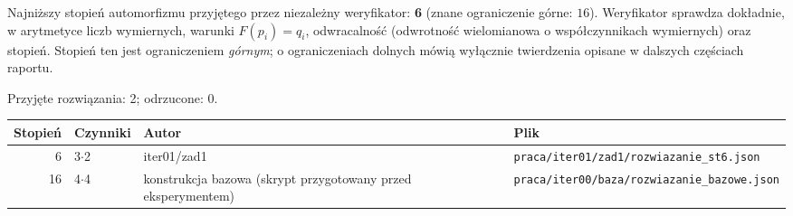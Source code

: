 Najniższy stopień automorfizmu przyjętego przez niezależny weryfikator: \textbf{6} (znane ograniczenie górne: $16$). Weryfikator sprawdza dokładnie, w arytmetyce liczb wymiernych, warunki $F(p_i)=q_i$, odwracalność (odwrotność wielomianowa o współczynnikach wymiernych) oraz stopień. Stopień ten jest ograniczeniem \emph{górnym}; o ograniczeniach dolnych mówią wyłącznie twierdzenia opisane w dalszych częściach raportu.

Przyjęte rozwiązania: 2; odrzucone: 0.
\begin{center}\small\begin{tabular}{rlp{5.2cm}p{5.6cm}}\toprule Stopień & Czynniki & Autor & Plik\\\midrule
6 & 3$\cdot$2 & iter01/zad1 & \texttt{praca/\allowbreak{}iter01/\allowbreak{}zad1/\allowbreak{}rozwiazanie\_st6.json}\\
16 & 4$\cdot$4 & konstrukcja bazowa (skrypt przygotowany przed eksperymentem) & \texttt{praca/\allowbreak{}iter00/\allowbreak{}baza/\allowbreak{}rozwiazanie\_bazowe.json}\\
\bottomrule\end{tabular}\end{center}
